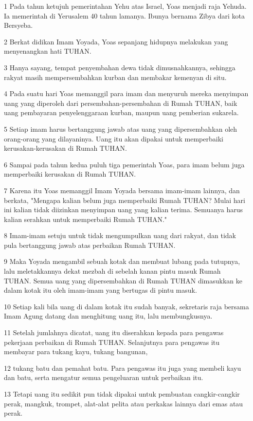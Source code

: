 \par 1 Pada tahun ketujuh pemerintahan Yehu atas Israel, Yoas menjadi raja Yehuda. Ia memerintah di Yerusalem 40 tahun lamanya. Ibunya bernama Zibya dari kota Bersyeba.
\par 2 Berkat didikan Imam Yoyada, Yoas sepanjang hidupnya melakukan yang menyenangkan hati TUHAN.
\par 3 Hanya sayang, tempat penyembahan dewa tidak dimusnahkannya, sehingga rakyat masih mempersembahkan kurban dan membakar kemenyan di situ.
\par 4 Pada suatu hari Yoas memanggil para imam dan menyuruh mereka menyimpan uang yang diperoleh dari persembahan-persembahan di Rumah TUHAN, baik uang pembayaran penyelenggaraan kurban, maupun uang pemberian sukarela.
\par 5 Setiap imam harus bertanggung jawab atas uang yang dipersembahkan oleh orang-orang yang dilayaninya. Uang itu akan dipakai untuk memperbaiki kerusakan-kerusakan di Rumah TUHAN.
\par 6 Sampai pada tahun kedua puluh tiga pemerintah Yoas, para imam belum juga memperbaiki kerusakan di Rumah TUHAN.
\par 7 Karena itu Yoas memanggil Imam Yoyada bersama imam-imam lainnya, dan berkata, "Mengapa kalian belum juga memperbaiki Rumah TUHAN? Mulai hari ini kalian tidak diizinkan menyimpan uang yang kalian terima. Semuanya harus kalian serahkan untuk memperbaiki Rumah TUHAN."
\par 8 Imam-imam setuju untuk tidak mengumpulkan uang dari rakyat, dan tidak pula bertanggung jawab atas perbaikan Rumah TUHAN.
\par 9 Maka Yoyada mengambil sebuah kotak dan membuat lubang pada tutupnya, lalu meletakkannya dekat mezbah di sebelah kanan pintu masuk Rumah TUHAN. Semua uang yang dipersembahkan di Rumah TUHAN dimasukkan ke dalam kotak itu oleh imam-imam yang bertugas di pintu masuk.
\par 10 Setiap kali bila uang di dalam kotak itu sudah banyak, sekretaris raja bersama Imam Agung datang dan menghitung uang itu, lalu membungkusnya.
\par 11 Setelah jumlahnya dicatat, uang itu diserahkan kepada para pengawas pekerjaan perbaikan di Rumah TUHAN. Selanjutnya para pengawas itu membayar para tukang kayu, tukang bangunan,
\par 12 tukang batu dan pemahat batu. Para pengawas itu juga yang membeli kayu dan batu, serta mengatur semua pengeluaran untuk perbaikan itu.
\par 13 Tetapi uang itu sedikit pun tidak dipakai untuk pembuatan cangkir-cangkir perak, mangkuk, trompet, alat-alat pelita atau perkakas lainnya dari emas atau perak.
